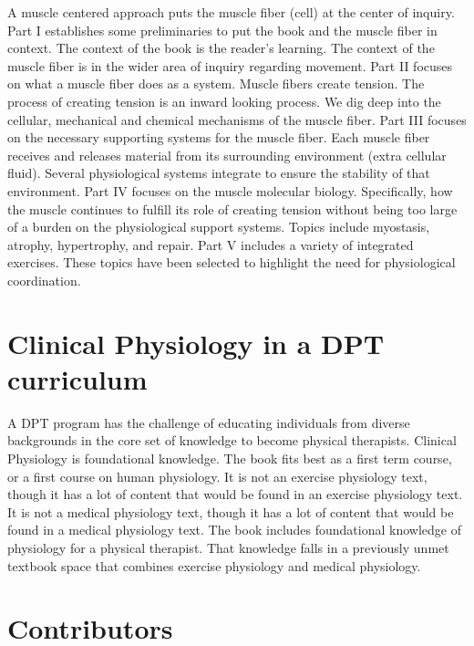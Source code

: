 {A muscle centered approach puts the muscle fiber (cell) at the center of inquiry. Part I establishes some preliminaries to put the book and the muscle fiber in context. The context of the book is the reader's learning. The context of the muscle fiber is in the wider area of inquiry regarding movement.  Part II focuses on what a muscle fiber does as a system. Muscle fibers create tension. The process of creating tension is an inward looking process. We dig deep into the cellular, mechanical and chemical mechanisms of the muscle fiber. Part III focuses on the necessary supporting systems for the muscle fiber. Each muscle fiber receives and releases material from its surrounding environment (extra cellular fluid). Several physiological systems integrate to ensure the stability of that environment. Part IV focuses on the muscle molecular biology. Specifically, how the muscle continues to fulfill its role of creating tension without being too large of a burden on the physiological support systems. Topics include myostasis, atrophy, hypertrophy, and repair. Part V includes a variety of integrated exercises. These topics have been selected to highlight the need for physiological coordination.

\vspace{5mm}

\section*{Clinical Physiology in a DPT curriculum}
A DPT program has the challenge of educating individuals from diverse backgrounds in the core set of knowledge to become physical therapists. Clinical Physiology is foundational knowledge. The book fits best as a first term course, or a first course on human physiology.\footnotemark{} It is not an exercise physiology text, though it has a lot of content that would be found in an exercise physiology text. It is not a medical physiology text, though it has a lot of content that would be found in a medical physiology text. The book includes foundational knowledge of physiology for a physical therapist. That knowledge falls in a previously unmet textbook space that combines exercise physiology and medical physiology. 

\section*{Contributors}

}
